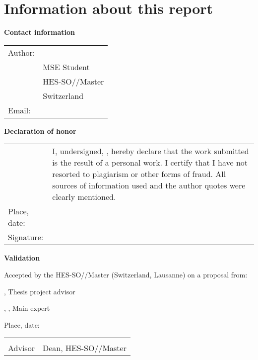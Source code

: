 \chapter*{Information about this report}

\vspace{\fill}

\textbf{Contact information}

\begin{tabularx}{\textwidth}{N{2.5cm}X}
	Author:	 & \AuthorFirstName \AuthorLastName \\
	& MSE Student \\
	& HES-SO//Master \\
	& Switzerland \\
	Email: & \email{\AuthorEmail}
\end{tabularx}

\vspace{\fill}

\textbf{Declaration of honor}

{\renewcommand{\arraystretch}{2}
\begin{tabularx}{\textwidth}{N{2.5cm}X}
	& I, undersigned, \Author, hereby declare that the work submitted is 
	the result of a personal work. I certify that I have not resorted to 
	plagiarism or other forms of fraud. All sources of information used and the 
	author quotes were clearly mentioned. \\
	Place, date: & \underline{\hspace{7cm}} \\ 
	Signature: & \underline{\hspace{7cm}}
\end{tabularx}
}

\vspace{\fill}

\textbf{Validation}

Accepted by the HES-SO//Master (Switzerland, Lausanne) on a proposal from:

\vspace{0.5cm}

\Advisor, Thesis project advisor

\Expert, \ExpertLab, Main expert

\vspace{1cm}

Place, date: \underline{\hspace{8cm}}

\vspace{3cm}

{ \renewcommand{\arraystretch}{1.5}
\begin{tabularx}{\textwidth}{X X}
	\Advisor  & \Dean\\ 
	Advisor   & Dean, HES-SO//Master\\
\end{tabularx}
}
